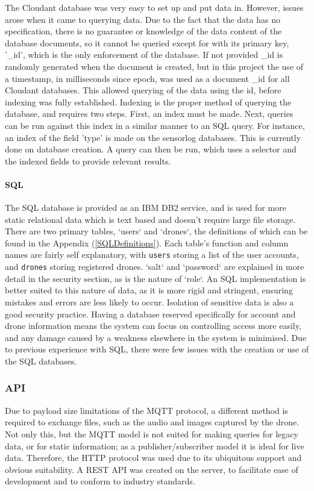 \documentclass{article}
\begin{document}
The Cloudant database was very easy to set up and put data in. However, issues arose when it came to querying data. Due to the fact that the data has no specification, there is no guarantee or knowledge of the data content of the database documents, so it cannot be queried except for with its primary key, '\_id', which is the only enforcement of the database. If not provided \_id is randomly generated when the document is created, but in this project the use of a timestamp, in milliseconds since epoch, was used as a document \_id for all Cloudant databases. This allowed querying of the data using the id, before indexing was fully established. Indexing is the proper method of querying the database, and requires two steps. First, an index must be made. Next, queries can be run against this index in a similar manner to an SQL query. For instance, an index of the field 'type' is made on the sensorlog databases. This is currently done on database creation. A query can then be run, which uses a selector and the indexed fields to provide relevant results.

\paragraph{SQL} \label{SQL}
The SQL database is provided as an IBM DB2 service, and is used for more static relational data which is text based and doesn't require large file storage. There are two primary tables, `users` and `drones`, the definitions of which can be found in the Appendix (\ref{SQLDefinitions}). Each table's function and column names are fairly self explanatory, with \texttt{users} storing a list of the user accounts, and \texttt{drones} storing registered drones. `salt` and `password` are explained in more detail in the security section, as is the nature of `role`. An SQL implementation is better suited to this nature of data, as it is more rigid and stringent, ensuring mistakes and errors are less likely to occur. Isolation of sensitive data is also a good security practice. Having a database reserved specifically for account and drone information means the system can focus on controlling access more easily, and any damage caused by a weakness elsewhere in the system is minimised. Due to previous experience with SQL, there were few issues with the creation or use of the SQL databases. 

\subsubsection{API} \label{API}
Due to payload size limitations of the MQTT protocol, a different method is required to exchange files, such as the audio and images captured by the drone. Not only this, but the MQTT model is not suited for making queries for legacy data, or for static information; as a publisher/subscriber model it is ideal for live data. Therefore, the HTTP protocol was used due to its ubiquitous support and obvious suitability. A REST API was created on the server, to facilitate ease of development and to conform to industry standards. 
\end{document}
